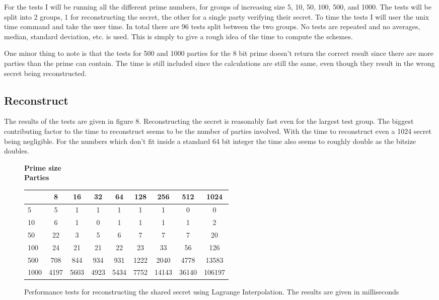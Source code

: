 \documentclass[a4paper,oneside,12pt,final]{article}
\begin{document}
For the tests I will be running all the different prime numbers, for groups of
increasing size 5, 10, 50, 100, 500, and 1000. The tests will be split into 2
groups, 1 for reconstructing the secret, the other for a single party verifying
their secret. To time the tests I will user the unix time command and take the
user time. In total there are 96 tests split between the two groups. No tests
are repeated and no averages, median, standard deviation, etc. is used. This is
simply to give a rough idea of the time to compute the schemes.

One minor thing to note is that the tests for 500 and 1000 parties for the 8 bit
prime doesn't return the correct result since there are more parties than the
prime can contain. The time is still included since the calculations are still
the same, even though they result in the wrong secret being reconstructed.

\subsection{Reconstruct}

The results of the tests are given in figure 8. Reconstructing the secret is
reasonably fast even for the largest test group. The biggest contributing factor
to the time to reconstruct seems to be the number of parties involved. With the
time to reconstruct even a 1024 secret being negligible. For the numbers which
don't fit inside a standard 64 bit integer the time also seems to roughly double
as the bitsize doubles. 

\begin{figure}[h]
\label{fig:reconstruct-test-results}
\center
\textbf{Prime size}\\[0.5em]
\textbf{Parties}
\begin{tabular}{l|cccccccc}
     & 8    & 16    & 32    & 64    & 128   & 256   & 512   & 1024  \\
\hline
5    & 5    &  1    &  1    &  1    &  1    & 1     & 0     & 0     \\
10   & 6    &  1    &  0    &  1    &  1    & 1     & 1     & 2     \\
50   & 22   &  3    &  5    &  6    &  7    & 7     & 7     & 20    \\
100  & 24   &  21   &  21   &  22   &  23   & 33    & 56    & 126   \\
500  & 708  &  844  &  934  &  931  &  1222 & 2040  & 4778  & 13583 \\
1000 & 4197 &  5603 &  4923 &  5434 &  7752 & 14143 & 36140 & 106197\\
\end{tabular}
\caption{Performance tests for reconstructing the shared secret using 
         Lagrange Interpolation. The results are given in milliseconds}
\end{figure}
\end{document}
